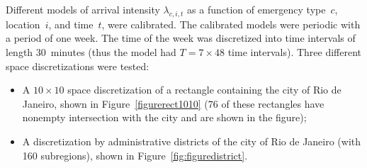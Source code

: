 \documentclass[article]{jss}
\newcommand{\ignore}[1]{}
\begin{document}
Different models of arrival intensity $\lambda_{c,i,t}$ as a function of emergency type~$c$, location~$i$, and time~$t$, were calibrated.
The calibrated models were periodic with a period of one week.
The time of the week was discretized into time intervals of length $30$~minutes (thus the model had $T = 7 \times 48$ time intervals).
Three different space discretizations were tested:
\begin{itemize}
\item
A $10 \times 10$ space discretization of a rectangle containing the city of Rio de Janeiro, shown in Figure~\ref{figurerect1010} (76 of these rectangles have nonempty intersection with the city and are shown in the figure);
\item
A discretization by administrative districts of the city of Rio de Janeiro (with 160 subregions), shown in Figure~\ref{fig:figuredistrict}.
\end{itemize}
\ignore{
Running Matlab function 
$$
{\tt{[lambda,lambdacov]=laspatedSAMUrj()}}
$$
builds the data for the rectangular discretization 10x10 and runs laspated calibration function. 
The output {\tt{lambda}} is the vector of intensities obtained calibrating the model without regressors from Section \ref{sec:model1} with penalties taken equal to 0.1 while the  output {\tt{lambdacov}} is the vector of intensities obtained calibrating the model with regressors from Section \ref{sec:modelcov} with penalties taken equal to 0.1.
The outputs for other discretizations can be obtained replacing the discretization folder Rect10x10 by the discretization folders corresponding to the other spatial discretizations, namely Rect100x100, Hex7, Hex8, and Districts for respectively the rectangular 100x100, Hexagonal with Uber scale factor 7, Hexagonal with Uber scale factor 8, and by districts.
For this application, there are three arrival types corresponding to calls of low priority (arrival type $c_{0}$), calls of intermediate priority (arrival type $c_{1}$), and calls of high priority (arrival type $c_{2}$).
}
\end{document}
